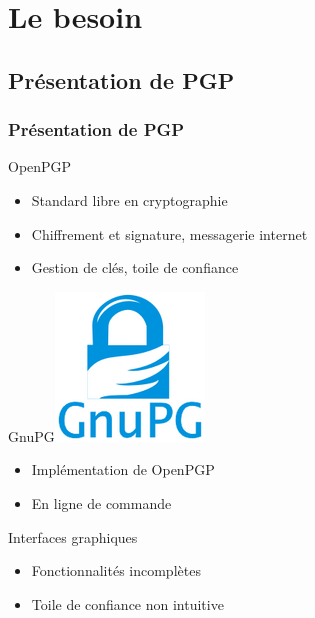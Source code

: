 \section{Le besoin}

\subsection{Présentation de PGP}

\begin{frame}
 \frametitle{\color{white} Présentation de PGP}
 \begin{block}{OpenPGP}
  \begin{itemize}
   \item Standard libre en cryptographie
   \item Chiffrement et signature, messagerie internet
   \item Gestion de clés, toile de confiance
  \end{itemize}

 \end{block}
 
 \begin{block}{GnuPG\hfill \includegraphics[scale=0.5]{../res/gnupg-logo}}
  \begin{itemize}
   \item Implémentation de OpenPGP
   \item En ligne de commande
  \end{itemize}
 \end{block}
 
 \begin{block}{Interfaces graphiques}
  \begin{itemize}
   \item Fonctionnalités incomplètes
   \item Toile de confiance non intuitive
  \end{itemize}

 \end{block}

\end{frame}


